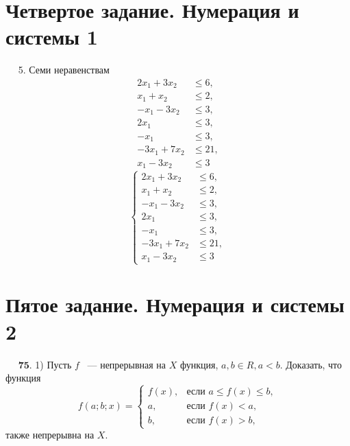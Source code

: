 \documentclass[a4paper,12pt]{article} %
\begin{document}
	\section{Четвертое задание. Нумерация и системы 1}
	$\quad$
	5. Семи неравенствам
	\begin{align}
		2x_1 + 3x_2 & \leqslant 6, \\
		x_1 + x_2 & \leqslant 2, \\
		-x_1 - 3x_2 & \leqslant 3, \\
		2x_1 \qquad & \leqslant 3, \\
		-x_1 \qquad & \leqslant 3, \\
		-3x_1 + 7x_2 & \leqslant 21, \\
		x_1 - 3x_2 & \leqslant 3
	\end{align}
	\[
	\begin{cases}
		2x_1 + 3x_2 & \leqslant 6, \\
		x_1 + x_2 & \leqslant 2, \\
		-x_1 - 3x_2 & \leqslant 3, \\
		2x_1 \qquad & \leqslant 3, \\
		-x_1 \qquad & \leqslant 3, \\
		-3x_1 + 7x_2 & \leqslant 21, \\
		x_1 - 3x_2 & \leqslant 3
	\end{cases} \tag{S}
	\]

	\section{Пятое задание. Нумерация и системы 2}
	$\quad$
	$\textbf{75.}$ 1) Пусть $f$ ~--- непрерывная на $X$ функция, $a, b \in R, a < b.$ Доказать, что функция
	\[
		f(a;b;x)=\begin{cases}
			f \left(x \right), &\text{если } a \leqslant f \left(x \right) \leqslant b, \\
		a, &\text{если } f \left(x \right) < a, \\
		b, &\text{если } f \left(x \right) > b,
		\end{cases}
	\]
	также непрерывна на $X.$

\end{document}
